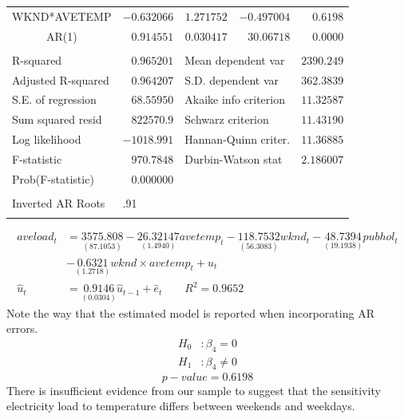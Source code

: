 \documentclass[12pt]{report}
\begin{document}
\begin{table}[H]
\begin{tabular}{lrrrr}
		\multicolumn{1}{c}{WKND*AVETEMP}&\multicolumn{1}{r}{$-0.632066$}&\multicolumn{1}{r}{$1.271752$}&\multicolumn{1}{r}{$-0.497004$}&\multicolumn{1}{r}{$0.6198$}\\
		\multicolumn{1}{c}{AR(1)}&\multicolumn{1}{r}{$0.914551$}&\multicolumn{1}{r}{$0.030417$}&\multicolumn{1}{r}{$30.06718$}&\multicolumn{1}{r}{$0.0000$}\\
		[4.5pt] \hline \\ [-4.5pt]
		\multicolumn{1}{l}{R-squared}&\multicolumn{1}{r}{$0.965201$}&\multicolumn{2}{l}{Mean dependent var}&\multicolumn{1}{r}{$2390.249$}\\
		\multicolumn{1}{l}{Adjusted R-squared}&\multicolumn{1}{r}{$0.964207$}&\multicolumn{2}{l}{S.D. dependent var}&\multicolumn{1}{r}{$362.3839$}\\
		\multicolumn{1}{l}{S.E. of regression}&\multicolumn{1}{r}{$68.55950$}&\multicolumn{2}{l}{Akaike info criterion}&\multicolumn{1}{r}{$11.32587$}\\
		\multicolumn{1}{l}{Sum squared resid}&\multicolumn{1}{r}{$822570.9$}&\multicolumn{2}{l}{Schwarz criterion}&\multicolumn{1}{r}{$11.43190$}\\
		\multicolumn{1}{l}{Log likelihood}&\multicolumn{1}{r}{$-1018.991$}&\multicolumn{2}{l}{Hannan-Quinn criter.}&\multicolumn{1}{r}{$11.36885$}\\
		\multicolumn{1}{l}{F-statistic}&\multicolumn{1}{r}{$970.7848$}&\multicolumn{2}{l}{Durbin-Watson stat}&\multicolumn{1}{r}{$2.186007$}\\
		\multicolumn{1}{l}{Prob(F-statistic)}&\multicolumn{1}{r}{$0.000000$}&\multicolumn{1}{c}{}&\multicolumn{1}{c}{}&\multicolumn{1}{c}{}\\
		[4.5pt] \hline \\ [-4.5pt]
		\multicolumn{1}{l}{Inverted AR Roots}&\multicolumn{1}{l}{.91}&\multicolumn{1}{c}{}&\multicolumn{1}{c}{}&\multicolumn{1}{c}{}\\
		[4.5pt] \hline \\ [-4.5pt]
	\end{tabular}
	\begin{align*}
	{aveload}_t &= \underset{(87.1053)}{3575.808} - \underset{(1.4940)}{26.32147}avetemp_t - \underset{(56.3083)}{118.7532}wknd_t - \underset{(19.1938)}{48.7394}pubhol_t \\
	&- \underset{(1.2718)}{0.6321}wknd\times avetemp_t + \hat{u}_t \\
	\hat{u}_t &= \underset{(0.0304)}{0.9146}\hat{u}_{t-1} + \hat{e}_t \qquad R^2 = 0.9652
	\end{align*} \justify \noindent Note the way that the estimated model is reported when incorporating AR errors.
	\begin{align*}
	H_0&: \beta_4 = 0 \\
	H_1&: \beta_4 \neq 0 
	\end{align*} $$p-value=0.6198$$
	\justify \noindent There is insufficient evidence from our sample to suggest that the sensitivity electricity load to temperature differs between weekends and weekdays.
\end{table}
\end{document}
